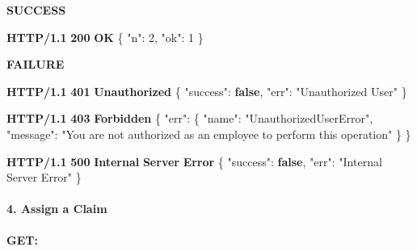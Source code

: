 \documentclass[
]{article}
\newenvironment{Shaded}{}{}
\newcommand{\DataTypeTok}[1]{\textcolor[rgb]{0.56,0.13,0.00}{#1}}
\newcommand{\DecValTok}[1]{\textcolor[rgb]{0.25,0.63,0.44}{#1}}
\newcommand{\ErrorTok}[1]{\textcolor[rgb]{1.00,0.00,0.00}{\textbf{#1}}}
\newcommand{\FunctionTok}[1]{\textcolor[rgb]{0.02,0.16,0.49}{#1}}
\newcommand{\KeywordTok}[1]{\textcolor[rgb]{0.00,0.44,0.13}{\textbf{#1}}}
\newcommand{\StringTok}[1]{\textcolor[rgb]{0.25,0.44,0.63}{#1}}
\begin{document}
\textbf{SUCCESS}

\begin{Shaded}
\begin{Highlighting}[]
\ErrorTok{HTTP/1.1} \ErrorTok{200} \ErrorTok{OK}
\FunctionTok{\{}
    \DataTypeTok{"n"}\FunctionTok{:} \DecValTok{2}\FunctionTok{,}
    \DataTypeTok{"ok"}\FunctionTok{:} \DecValTok{1}
\FunctionTok{\}}
\end{Highlighting}
\end{Shaded}

\textbf{FAILURE}

\begin{Shaded}
\begin{Highlighting}[]
\ErrorTok{HTTP/1.1} \ErrorTok{401} \ErrorTok{Unauthorized}
\FunctionTok{\{}
    \DataTypeTok{"success"}\FunctionTok{:} \KeywordTok{false}\FunctionTok{,}
    \DataTypeTok{"err"}\FunctionTok{:} \StringTok{"Unauthorized User"}
\FunctionTok{\}}
\end{Highlighting}
\end{Shaded}

\begin{Shaded}
\begin{Highlighting}[]
\ErrorTok{HTTP/1.1} \ErrorTok{403} \ErrorTok{Forbidden}
\FunctionTok{\{}
    \DataTypeTok{"err"}\FunctionTok{:} \FunctionTok{\{}
        \DataTypeTok{"name"}\FunctionTok{:} \StringTok{"UnauthorizedUserError"}\FunctionTok{,}
        \DataTypeTok{"message"}\FunctionTok{:} \StringTok{"You are not authorized as an employee to perform this operation"}
    \FunctionTok{\}}
\FunctionTok{\}}
\end{Highlighting}
\end{Shaded}

\begin{Shaded}
\begin{Highlighting}[]
\ErrorTok{HTTP/1.1} \ErrorTok{500} \ErrorTok{Internal} \ErrorTok{Server} \ErrorTok{Error}
\FunctionTok{\{}
    \DataTypeTok{"success"}\FunctionTok{:} \KeywordTok{false}\FunctionTok{,}
    \DataTypeTok{"err"}\FunctionTok{:} \StringTok{"Internal Server Error"}
\FunctionTok{\}}
\end{Highlighting}
\end{Shaded}

\hypertarget{header-n918}{%
\paragraph{4. Assign a Claim}\label{header-n918}}

\textbf{GET:}
\end{document}
